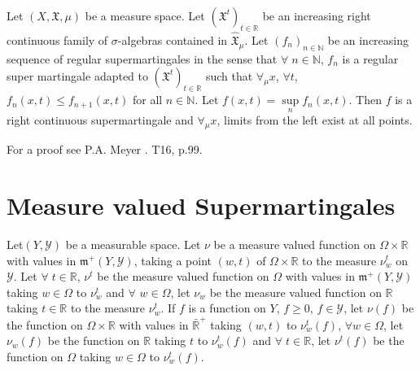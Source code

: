 Let $(X, \mathfrak{X}, \mu)$ be a measure space. Let
$(\mathfrak{X}^t)_{t \in \mathbb{R}}$ be an increasing right
continuous family of $\sigma$-algebras contained in
$\hat{\mathfrak{X}}_\mu$. Let $(f_n)_{n \in \mathbb{N}}$ be an
increasing sequence of regular supermartingales in the sense that
$\forall \; n \in \mathbb{N}$, $f_n$ is a regular super martingale
adapted to $(\mathfrak{X}^t)_{t \in \mathbb{R}}$ such that
$\forall_\mu x$, $\forall t$, $f_n(x,t) \leq f_{n+1} (x,t)$ for all $n
\in \mathbb{N}$. Let $f(x,t) = \sup\limits_{n} f_n(x,t)$. Then $f$ is
a right continuous supermartingale and $\forall_\mu x$, limits from
the left exist at all points.

For a proof see P.A. Meyer \cite{key1}. T16, p.99. 

\section{Measure valued Supermartingales}\label{part2:chap4:sec2}

Let\pageoriginale $(Y,\mathscr{Y})$ be a measurable space. Let $\nu$
be a measure valued function on $\Omega \times \mathbb{R}$ with values
in $\mathfrak{m}^+ (Y, \mathscr{Y})$, taking a point $(w,t)$ of
$\Omega \times \mathbb{R}$ to the measure $\nu^t_w$ on
$\mathscr{Y}$. Let $\forall \; t \in \mathbb{R}$, $\nu^t$ be the
measure valued function on $\Omega$ with values in $\mathfrak{m}^+ (Y,
\mathscr{Y})$ taking $w \in \Omega$ to $\nu^t_w$ and $\forall $ $w
\in\Omega$, let $\nu_w$ be the measure valued function on $\mathbb{R}$
taking $t \in\mathbb{R} $ to the measure $\nu^t_w$. If $f$ is a
function on $Y$, $f\geq 0$, $f \in\mathscr{Y}$, let $\nu(f)$ be the
function on $\Omega \times \mathbb{R}$ with values in
$\bar{\mathbb{R}}^+$ taking $(w,t)$ to $\nu^t_w (f)$, $\forall w
\in\Omega$, let $\nu_w(f)$ be the function on $\mathbb{R}$ taking $t$
to $\nu^t_w (f)$ and $\forall \; t \in \mathbb{R}$, let $\nu^t(f)$ be
the function on $\Omega$ taking $w \in \Omega$ to $\nu^t_w(f)$. 

